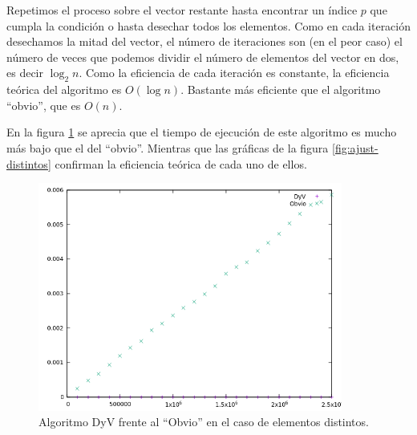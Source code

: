 \documentclass[a4]{article}
\begin{document}
Repetimos el proceso sobre el vector restante hasta encontrar un
índice $p$ que cumpla la condición o hasta desechar todos los
elementos. Como en cada iteración desechamos la mitad del vector, el
número de iteraciones son (en el peor caso) el número de veces que
podemos dividir el número de elementos del vector en dos, es decir
$\log_2n$. Como la eficiencia de cada iteración es constante, la
eficiencia teórica del algoritmo es $O(\log n)$. Bastante más
eficiente que el algoritmo ``obvio'', que es $O(n)$.

En la figura \ref{fig:comp-distintos} se aprecia que el tiempo de
ejecución de este algoritmo es mucho más bajo que el del ``obvio''.
Mientras que las gráficas de la figura \ref{fig:ajust-distintos}
confirman la eficiencia teórica de cada uno de ellos.

\begin{figure}[H]
  \centering
  \caption{Algoritmo DyV frente al ``Obvio'' en el caso de elementos distintos.}
  \label{fig:comp-distintos}
  \includegraphics[width=100mm]{graficos/comparacion}
\end{figure}
\end{document}
